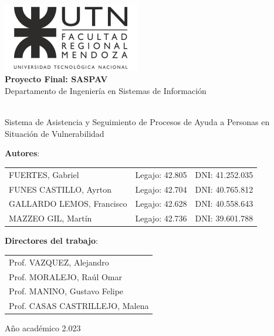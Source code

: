 \pagestyle{empty}
\begin{titlepage}

\mbox{}
\vspace{-2cm}

\begin{center}
    \includegraphics[width=6cm]{./figuras/logo/frm.jpg}
    \\
    \vspace{1cm}
    {\Huge \bf Proyecto Final: SASPAV}
    \\
    \vspace{0.25cm}
    {\Large Departamento de Ingeniería en Sistemas de Información}
    \\
    \vspace{0.5cm}
    
    \\
    \vspace{0.5cm}
    {Sistema de Asistencia y Seguimiento de Procesos de Ayuda a Personas en Situación de Vulnerabilidad}\\
\end{center}

\noindent
\textbf{\large{Autores}}:\\
\begin{tabularx}{\textwidth}{Xlr}
    FUERTES, Gabriel & Legajo: 42.805 & DNI: 41.252.035\\
    FUNES CASTILLO, Ayrton & Legajo: 42.704 & DNI: 40.765.812\\
    GALLARDO LEMOS, Francisco & Legajo: 42.628 & DNI: 40.558.643\\
    MAZZEO GIL, Martín & Legajo: 42.736 & DNI: 39.601.788\\
\end{tabularx}

\vspace{0.5cm}

\noindent
\textbf{\large{Directores del trabajo}}:\\
\begin{tabular}{l}
    Prof. VAZQUEZ, Alejandro\\
    Prof. MORALEJO, Raúl Omar\\
    Prof. MANINO, Gustavo Felipe\\
    Prof. CASAS CASTRILLEJO, Malena\\
\end{tabular}

\vspace{0.5cm}

\begin{center}
    Año académico 2.023\\
\end{center}
\begin{center}
    
\end{center}

\end{titlepage}

\null
\cleardoublepage
